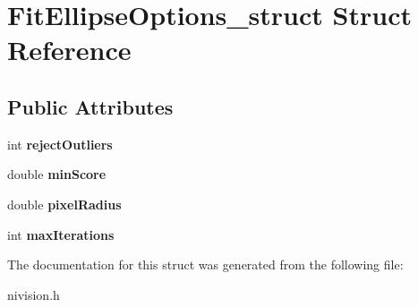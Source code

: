 \hypertarget{structFitEllipseOptions__struct}{
\section{FitEllipseOptions\_\-struct Struct Reference}
\label{structFitEllipseOptions__struct}
}
\subsection*{Public Attributes}
\begin{DoxyCompactItemize}
\item 
\hypertarget{structFitEllipseOptions__struct_a67d79a730b0536924c952515b296b959}{
int {\bfseries rejectOutliers}}
\label{structFitEllipseOptions__struct_a67d79a730b0536924c952515b296b959}

\item 
\hypertarget{structFitEllipseOptions__struct_ac8f3c8f981a94dcd6b37c2bab3ebfe4c}{
double {\bfseries minScore}}
\label{structFitEllipseOptions__struct_ac8f3c8f981a94dcd6b37c2bab3ebfe4c}

\item 
\hypertarget{structFitEllipseOptions__struct_a21ec7d69ceefa36bf73b4e5ddb3ad6cd}{
double {\bfseries pixelRadius}}
\label{structFitEllipseOptions__struct_a21ec7d69ceefa36bf73b4e5ddb3ad6cd}

\item 
\hypertarget{structFitEllipseOptions__struct_a406e34d5a6168d16e89f04fe80e6e3fa}{
int {\bfseries maxIterations}}
\label{structFitEllipseOptions__struct_a406e34d5a6168d16e89f04fe80e6e3fa}

\end{DoxyCompactItemize}


The documentation for this struct was generated from the following file:\begin{DoxyCompactItemize}
\item 
nivision.h\end{DoxyCompactItemize}
